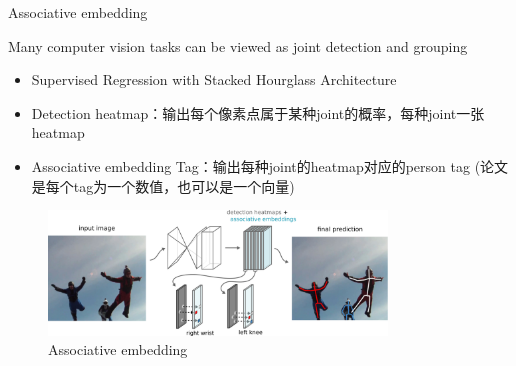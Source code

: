 \documentclass{ctexbeamer}
\begin{document}
  \begin{frame}{Associative embedding}
  
  \begin{block}{Many computer vision tasks can be viewed as joint detection and grouping}
  \end{block}
  \begin{itemize}
  \item Supervised Regression with Stacked Hourglass Architecture
  \item Detection heatmap：输出每个像素点属于某种joint的概率，每种joint一张heatmap
  \item Associative embedding Tag：输出每种joint的heatmap对应的person tag (论文是每个tag为一个数值，也可以是一个向量)
  \end{itemize}
  
  \begin{figure}
    \includegraphics[width=9cm]{fig/ae-overview.png}
    \caption{\label{fig:ae-overview}Associative embedding}
    \end{figure}
  
  \vskip 1cm
  \end{frame}
\end{document}
